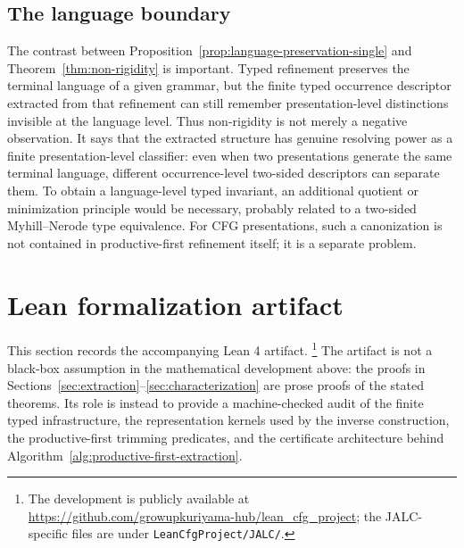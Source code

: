 \documentclass[sub]{jalc}
\begin{document}
\subsection{The language boundary}
\label{subsec:language-boundary}

\begin{remark}
\label{rem:non-rigidity-implications}
The contrast between Proposition~\ref{prop:language-preservation-single} and Theorem~\ref{thm:non-rigidity} is important. Typed refinement preserves the terminal language of a given grammar, but the finite typed occurrence descriptor extracted from that refinement can still remember presentation-level distinctions invisible at the language level. Thus non-rigidity is not merely a negative observation. It says that the extracted structure has genuine resolving power as a finite presentation-level classifier: even when two presentations generate the same terminal language, different occurrence-level two-sided descriptors can separate them. To obtain a language-level typed invariant, an additional quotient or minimization principle would be necessary, probably related to a two-sided Myhill--Nerode type equivalence. For CFG presentations, such a canonization is not contained in productive-first refinement itself; it is a separate problem.
\end{remark}







\section{Lean formalization artifact}
\label{sec:lean-artifact}

This section records the accompanying Lean 4 artifact.%
\footnote{The development is publicly available at
\url{https://github.com/growupkuriyama-hub/lean_cfg_project}; the JALC-specific
files are under \texttt{LeanCfgProject/JALC/}.}
The artifact is not a black-box assumption in the mathematical development
above: the proofs in Sections~\ref{sec:extraction}--\ref{sec:characterization}
are prose proofs of the stated theorems.  Its role is instead to provide a
machine-checked audit of the finite typed infrastructure, the representation
kernels used by the inverse construction, the productive-first trimming
predicates, and the certificate architecture behind
Algorithm~\ref{alg:productive-first-extraction}.
\end{document}
